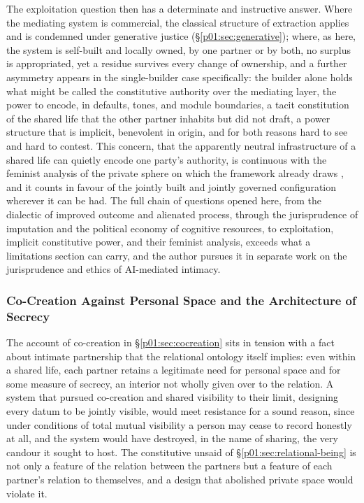 The exploitation question then has a determinate and instructive answer. Where the mediating system is commercial, the classical structure of extraction applies and is condemned under generative justice (§\ref{p01:sec:generative}); where, as here, the system is self-built and locally owned, by one partner or by both, no surplus is appropriated, yet a residue survives every change of ownership, and a further asymmetry appears in the single-builder case specifically: the builder alone holds what might be called the constitutive authority over the mediating layer, the power to encode, in defaults, tones, and module boundaries, a tacit constitution of the shared life that the other partner inhabits but did not draft, a power structure that is implicit, benevolent in origin, and for both reasons hard to see and hard to contest. This concern, that the apparently neutral infrastructure of a shared life can quietly encode one party's authority, is continuous with the feminist analysis of the private sphere on which the framework already draws \parencite{gilligan1982voice, held2006ethics, tronto1993moral}, and it counts in favour of the jointly built and jointly governed configuration wherever it can be had. The full chain of questions opened here, from the dialectic of improved outcome and alienated process, through the jurisprudence of imputation and the political economy of cognitive resources, to exploitation, implicit constitutive power, and their feminist analysis, exceeds what a limitations section can carry, and the author pursues it in separate work on the jurisprudence and ethics of AI-mediated intimacy.

\subsubsection{Co-Creation Against Personal Space and the Architecture of Secrecy}

The account of co-creation in §\ref{p01:sec:cocreation} sits in tension with a fact about intimate partnership that the relational ontology itself implies: even within a shared life, each partner retains a legitimate need for personal space and for some measure of secrecy, an interior not wholly given over to the relation. A system that pursued co-creation and shared visibility to their limit, designing every datum to be jointly visible, would meet resistance for a sound reason, since under conditions of total mutual visibility a person may cease to record honestly at all, and the system would have destroyed, in the name of sharing, the very candour it sought to host. The constitutive unsaid of §\ref{p01:sec:relational-being} is not only a feature of the relation between the partners but a feature of each partner's relation to themselves, and a design that abolished private space would violate it.

